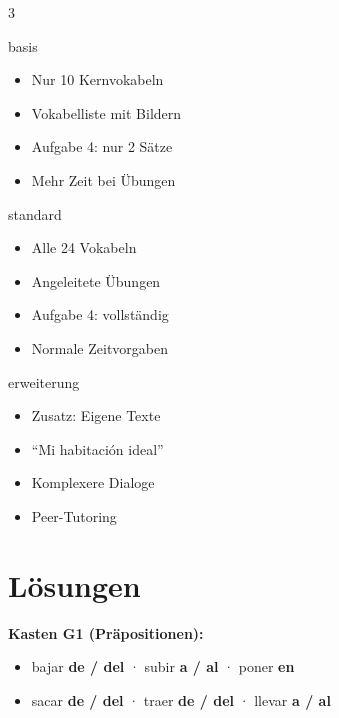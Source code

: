 \documentclass[11pt, a4paper]{article}
\begin{document}
\begin{multicols}{3}

\begin{diffbox}[{[B] Basis}]{basis}
\footnotesize
\begin{itemize}[leftmargin=1em, itemsep=2pt]
    \item Nur 10 Kernvokabeln
    \item Vokabelliste mit Bildern
    \item Aufgabe 4: nur 2 Sätze
    \item Mehr Zeit bei Übungen
\end{itemize}
\end{diffbox}

\columnbreak

\begin{diffbox}[{[S] Standard}]{standard}
\footnotesize
\begin{itemize}[leftmargin=1em, itemsep=2pt]
    \item Alle 24 Vokabeln
    \item Angeleitete Übungen
    \item Aufgabe 4: vollständig
    \item Normale Zeitvorgaben
\end{itemize}
\end{diffbox}

\columnbreak

\begin{diffbox}[{[E] Erweiterung}]{erweiterung}
\footnotesize
\begin{itemize}[leftmargin=1em, itemsep=2pt]
    \item Zusatz: Eigene Texte
    \item ``Mi habitación ideal''
    \item Komplexere Dialoge
    \item Peer-Tutoring
\end{itemize}
\end{diffbox}

\end{multicols}


\section*{Lösungen}

\textbf{Kasten G1 (Präpositionen):}
\begin{itemize}[leftmargin=1.5em, itemsep=0pt]
    \item bajar \textbf{de / del} · subir \textbf{a / al} · poner \textbf{en}
    \item sacar \textbf{de / del} · traer \textbf{de / del} · llevar \textbf{a / al}
\end{itemize}
\end{document}
